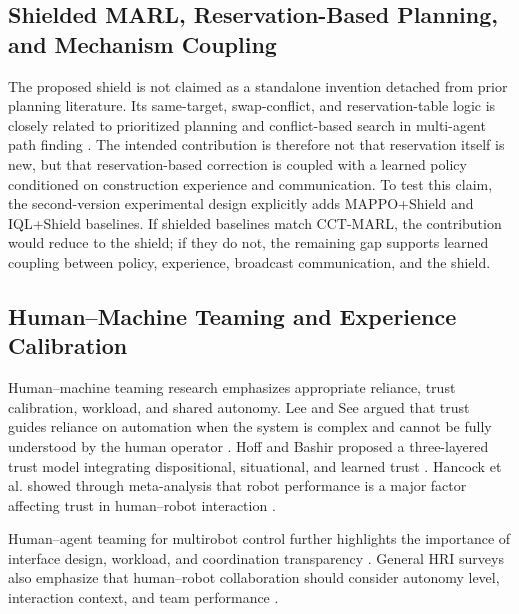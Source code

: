 \documentclass[preprint,12pt]{elsarticle}
\begin{document}
\subsection{Shielded MARL, Reservation-Based Planning, and Mechanism Coupling}

The proposed shield is not claimed as a standalone invention detached from prior planning literature. Its same-target, swap-conflict, and reservation-table logic is closely related to prioritized planning and conflict-based search in multi-agent path finding \cite{Sharon2015CBS,Stern2019MAPF,Li2021LifelongMAPF}. The intended contribution is therefore not that reservation itself is new, but that reservation-based correction is coupled with a learned policy conditioned on construction experience and communication. To test this claim, the second-version experimental design explicitly adds MAPPO+Shield and IQL+Shield baselines. If shielded baselines match CCT-MARL, the contribution would reduce to the shield; if they do not, the remaining gap supports learned coupling between policy, experience, broadcast communication, and the shield.

\subsection{Human--Machine Teaming and Experience Calibration}

Human--machine teaming research emphasizes appropriate reliance, trust calibration, workload, and shared autonomy. Lee and See argued that trust guides reliance on automation when the system is complex and cannot be fully understood by the human operator \cite{LeeSee2004Trust}. Hoff and Bashir proposed a three-layered trust model integrating dispositional, situational, and learned trust \cite{HoffBashir2015Trust}. Hancock et al. showed through meta-analysis that robot performance is a major factor affecting trust in human--robot interaction \cite{Hancock2011TrustHRI}.

Human--agent teaming for multirobot control further highlights the importance of interface design, workload, and coordination transparency \cite{ChenBarnes2014HumanAgentTeaming}. General HRI surveys also emphasize that human--robot collaboration should consider autonomy level, interaction context, and team performance \cite{GoodrichSchultz2007HRI,Parasuraman2000LevelsAutomation}.
\end{document}
